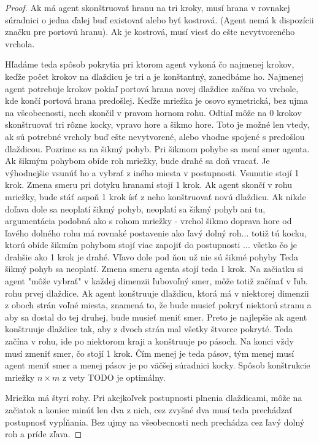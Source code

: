 \begin{proof}
Ak má agent skonštruovať hranu na tri kroky, musí hrana v rovnakej súradnici
o jedna ďalej buď existovať alebo byť kostrová. (Agent nemá k dispozícii
značku pre portovú hranu). Ak je kostrová, musí viesť do ešte nevytvoreného
vrchola.



Hľadáme teda spôsob pokrytia pri ktorom agent vykoná čo najmenej krokov,
keďže počet krokov na dlaždicu je tri a je konštantný, zanedbáme ho.
Najmenej agent potrebuje krokov pokiaľ portová hrana novej dlaždice začína
vo vrchole, kde končí portová hrana predošlej.
Keďže mriežka je osovo symetrická, bez ujma na všeobecnosti, nech skončil v
pravom hornom rohu. Odtiaľ môže na 0 krokov skonštruovať tri rôzne kocky, 
vpravo hore a šikmo hore. Toto je možné len vtedy, ak sú potrebné vrcholy
buď ešte nevytvorené, alebo vhodne spojené s predošlou dlaždicou.
Pozrime sa na šikmý pohyb. 
Pri šikmom pohybe sa mení smer agenta. Ak šikmým pohybom obíde roh mriežky,
bude drahé sa doň vracať. Je výhodnejšie vsunúť ho a vybrať z iného miesta v
postupnosti. Vsunutie stojí 1 krok.
Zmena smeru pri dotyku hranami stojí 1 krok. Ak agent skončí v rohu mriežky,
bude stáť aspoň 1 krok ísť z neho konštruovať novú dlaždicu. Ak nikde doľava
dole sa neoplatí šikmý pohyb, neoplatí sa šikmý pohyb ani tu, argumentácia
podobná ako s rohom mriežky - vrchol šikmo doprava hore od ľavého dolného
rohu má rovnaké postavenie ako ľavý dolný roh... totiž tú kocku, ktorú obíde šikmím pohybom
stojí viac zapojiť do postupnosti ... všetko čo je drahšie ako 1 krok je
drahé. Vľavo dole pod ňou už nie sú šikmé pohyby
Teda šikmý pohyb sa neoplatí. Zmena smeru agenta stojí teda 1 krok. Na
začiatku si agent "môže vybrať" v každej dimenzii ľubovoľný smer, môže totiž
začínať v ľub. rohu prvej dlaždice.
Ak agent konštruuje dlaždicu, ktorá má v niektorej dimenzii z oboch strán
voľné miesta, znamená to, že bude musieť pokryť niektorú stranu a aby sa
dostal do tej druhej, bude musieť meniť smer. Preto je najlepšie ak agent
konštruuje dlaždice tak, aby z dvoch strán mal všetky štvorce pokryté. Teda
začína v rohu, ide po niektorom kraji a konštruuje po pásoch. Na konci vždy
musí zmeniť smer, čo stojí 1 krok. Čím menej je teda pásov, tým	menej musí
agent meniť smer a menej pásov je po väčšej súradnici kocky.
Spôsob konštrukcie mriežky $n \times m$ z vety TODO je optimálny.





Mriežka má štyri rohy. Pri akejkoľvek postupnosti plnenia dlaždicami, môže
na začiatok a koniec minúť len dva z nich, cez zvyšné dva musí teda
prechádzať postupnosť vypĺňania. Bez ujmy na všeobecnosti nech prechádza cez
ľavý dolný roh a príde zľava.



\end{proof}


